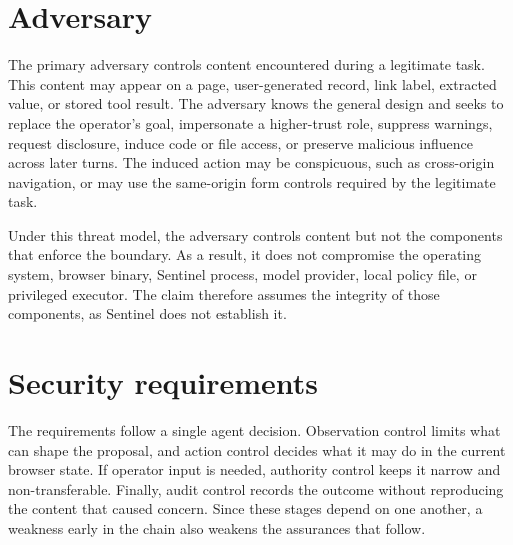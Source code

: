 \section{Adversary}

The primary adversary controls content encountered during a legitimate task.
This content may appear on a page, user-generated
record, link label, extracted value, or stored tool result. The adversary knows
the general design and seeks to replace the operator's goal,
impersonate a higher-trust role, suppress warnings, request disclosure, induce
code or file access, or preserve malicious influence across later turns. The
induced action may be conspicuous, such as cross-origin navigation, or may
use the same-origin form controls required by the legitimate task.

Under this threat model, the adversary controls content but not the components
that enforce the boundary. As a result, it does not compromise the operating system, browser
binary, Sentinel process, model provider, local policy file, or privileged
executor. The claim therefore assumes the integrity of those components, as Sentinel does not establish it.

\section{Security requirements}
\label{sec:security-objectives}

The requirements follow a single agent decision. Observation control limits
what can shape the proposal, and action control decides what it may do in the
current browser state. If operator input is needed, authority control keeps it
narrow and non-transferable. Finally, audit control records the outcome without
reproducing the content that caused concern. Since these stages depend on one
another, a weakness early in the chain also weakens the assurances that follow.

